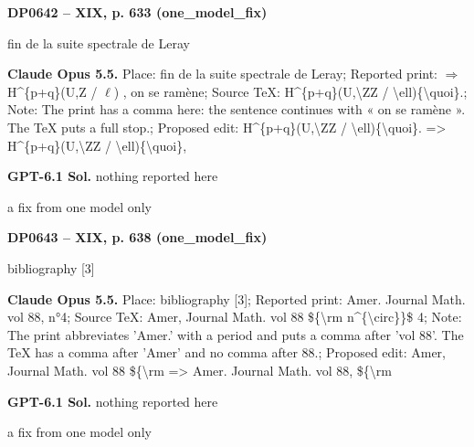 \par\noindent\hypertarget{DP0642}{}\textbf{DP0642 -- XIX, p. 633 (one\_model\_fix)}\par
fin de la suite spectrale de Leray\par
\textbf{Claude Opus 5.5.} Place: fin de la suite spectrale de Leray; Reported print: \ensuremath{\Longrightarrow} H\textasciicircum{}\{p+q\}(U,Z / \ensuremath{\ell}) ,  on se ramène; Source TeX: H\textasciicircum{}\{p+q\}(U,\textbackslash{}ZZ / \textbackslash{}ell)\{\textbackslash{}quoi\}.; Note: The print has a comma here: the sentence continues with « on se ramène ». The TeX puts a full stop.; Proposed edit: H\textasciicircum{}\{p+q\}(U,\textbackslash{}ZZ / \textbackslash{}ell)\{\textbackslash{}quoi\}. =\allowbreak > H\textasciicircum{}\{p+q\}(U,\textbackslash{}ZZ / \textbackslash{}ell)\{\textbackslash{}quoi\},\par
\textbf{GPT-6.1 Sol.} nothing reported here\par
a fix from one model only\par
\par\noindent\hypertarget{DP0643}{}\textbf{DP0643 -- XIX, p. 638 (one\_model\_fix)}\par
bibliography [3]\par
\textbf{Claude Opus 5.5.} Place: bibliography [3]; Reported print: Amer. Journal Math. vol 88, n°4; Source TeX: Amer, Journal Math. vol 88 \$\{\textbackslash{}rm n\textasciicircum{}\{\textbackslash{}circ\}\}\$ 4; Note: The print abbreviates 'Amer.' with a period and puts a comma after 'vol 88'. The TeX has a comma after 'Amer' and no comma after 88.; Proposed edit: Amer, Journal Math. vol 88 \$\{\textbackslash{}rm =\allowbreak > Amer. Journal Math. vol 88, \$\{\textbackslash{}rm\par
\textbf{GPT-6.1 Sol.} nothing reported here\par
a fix from one model only\par
\endgroup
